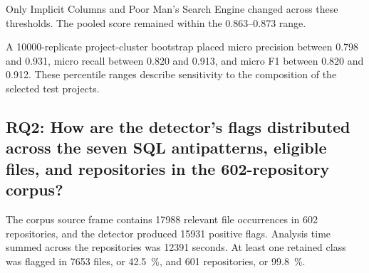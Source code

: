 Only Implicit Columns and Poor Man's Search Engine changed across these thresholds. The pooled score remained within the \num{0.863}--\num{0.873} range.

A \num{10000}-replicate project-cluster bootstrap placed micro precision between \num{0.798} and \num{0.931}, micro recall between \num{0.820} and \num{0.913}, and micro F1 between \num{0.820} and \num{0.912}. These percentile ranges describe sensitivity to the composition of the selected test projects.

\subsection{RQ2: How are the detector's flags distributed across the seven SQL antipatterns, eligible files, and repositories in the 602-repository corpus?}\label{sec:rq2CorpusFlags}

The corpus source frame contains \num{17988} relevant file occurrences in \num{602} repositories, and the detector produced \num{15931} positive flags. Analysis time summed across the repositories was \num{12391} seconds. At least one retained class was flagged in \num{7653} files, or \qty{42.5}{\percent}, and \num{601} repositories, or \qty{99.8}{\percent}.

